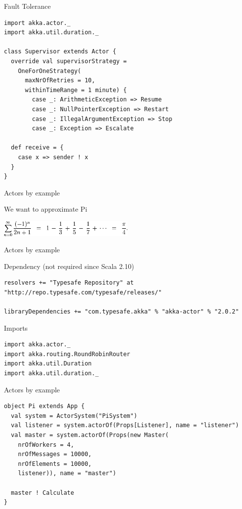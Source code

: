 \begin{frame}[fragile]{Fault Tolerance}
\begin{lstlisting}
import akka.actor._
import akka.util.duration._

class Supervisor extends Actor {
  override val supervisorStrategy = 
    OneForOneStrategy(
      maxNrOfRetries = 10,
      withinTimeRange = 1 minute) {
        case _: ArithmeticException => Resume
        case _: NullPointerException => Restart
        case _: IllegalArgumentException => Stop
        case _: Exception => Escalate
        
  def receive = {
    case x => sender ! x
  }
}
\end{lstlisting}
\end{frame}

\begin{frame}{Actors by example}
\begin{center}
We want to approximate Pi
\end{center}
\begin{center}
\includegraphics[width = 0.5\textwidth]{resources/Pi.png}
\end{center}
\end{frame}

\begin{frame}[fragile]{Actors by example}
\begin{exampleblock}{Dependency (not required since Scala 2.10)}
\begin{lstlisting}[basicstyle=\scriptsize]
resolvers += "Typesafe Repository" at "http://repo.typesafe.com/typesafe/releases/"

libraryDependencies += "com.typesafe.akka" % "akka-actor" % "2.0.2"
\end{lstlisting}
\end{exampleblock}
\pause
\begin{exampleblock}{Imports}
\begin{lstlisting}
import akka.actor._
import akka.routing.RoundRobinRouter
import akka.util.Duration
import akka.util.duration._
\end{lstlisting}
\end{exampleblock}
\end{frame}

\begin{frame}[fragile]{Actors by example}
\begin{lstlisting}
object Pi extends App {
  val system = ActorSystem("PiSystem")
  val listener = system.actorOf(Props[Listener], name = "listener")
  val master = system.actorOf(Props(new Master(
    nrOfWorkers = 4,
    nrOfMessages = 10000,
    nrOfElements = 10000,
    listener)), name = "master")
 
  master ! Calculate
}
\end{lstlisting}
\end{frame}

